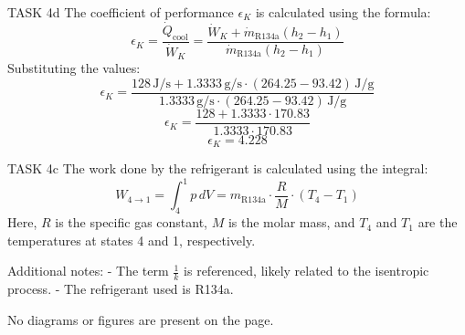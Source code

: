 TASK 4d  
The coefficient of performance \( \epsilon_K \) is calculated using the formula:  
\[
\epsilon_K = \frac{\dot{Q}_{\text{cool}}}{\dot{W}_K} = \frac{\dot{W}_K + \dot{m}_{\text{R134a}} (h_{2} - h_{1})}{\dot{m}_{\text{R134a}} (h_{2} - h_{1})}
\]  
Substituting the values:  
\[
\epsilon_K = \frac{128 \, \text{J/s} + 1.3333 \, \text{g/s} \cdot (264.25 - 93.42) \, \text{J/g}}{1.3333 \, \text{g/s} \cdot (264.25 - 93.42) \, \text{J/g}}
\]  
\[
\epsilon_K = \frac{128 + 1.3333 \cdot 170.83}{1.3333 \cdot 170.83}
\]  
\[
\epsilon_K = 4.228
\]  

TASK 4c  
The work done by the refrigerant is calculated using the integral:  
\[
W_{4 \to 1} = \int_{4}^{1} p \, dV = m_{\text{R134a}} \cdot \frac{R}{M} \cdot (T_4 - T_1)
\]  
Here, \( R \) is the specific gas constant, \( M \) is the molar mass, and \( T_4 \) and \( T_1 \) are the temperatures at states 4 and 1, respectively.  

Additional notes:  
- The term \( \frac{1}{k} \) is referenced, likely related to the isentropic process.  
- The refrigerant used is R134a.  

No diagrams or figures are present on the page.